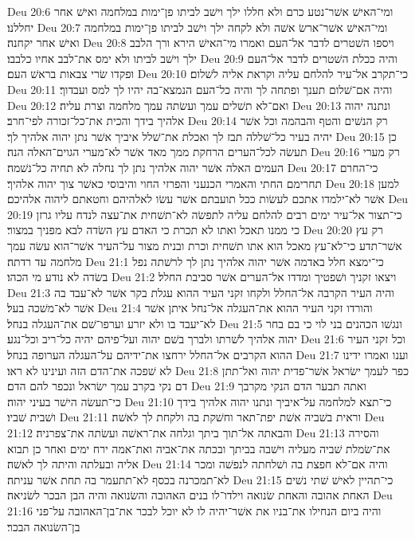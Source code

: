Deu 20:6  ומי־האישׁ אשׁר־נטע כרם ולא חללו ילך וישׁב לביתו פן־ימות במלחמה ואישׁ אחר יחללנו׃
Deu 20:7  ומי־האישׁ אשׁר־ארשׂ אשׁה ולא לקחה ילך וישׁב לביתו פן־ימות במלחמה ואישׁ אחר יקחנה׃
Deu 20:8  ויספו השׁטרים לדבר אל־העם ואמרו מי־האישׁ הירא ורך הלבב ילך וישׁב לביתו ולא ימס את־לבב אחיו כלבבו׃
Deu 20:9  והיה ככלת השׁטרים לדבר אל־העם ופקדו שׂרי צבאות בראשׁ העם׃
Deu 20:10  כי־תקרב אל־עיר להלחם עליה וקראת אליה לשׁלום׃
Deu 20:11  והיה אם־שׁלום תענך ופתחה לך והיה כל־העם הנמצא־בה יהיו לך למס ועבדוך׃
Deu 20:12  ואם־לא תשׁלים עמך ועשׂתה עמך מלחמה וצרת עליה׃
Deu 20:13  ונתנה יהוה אלהיך בידך והכית את־כל־זכורה לפי־חרב׃
Deu 20:14  רק הנשׁים והטף והבהמה וכל אשׁר יהיה בעיר כל־שׁללה תבז לך ואכלת את־שׁלל איביך אשׁר נתן יהוה אלהיך לך׃
Deu 20:15  כן תעשׂה לכל־הערים הרחקת ממך מאד אשׁר לא־מערי הגוים־האלה הנה׃
Deu 20:16  רק מערי העמים האלה אשׁר יהוה אלהיך נתן לך נחלה לא תחיה כל־נשׁמה׃
Deu 20:17  כי־החרם תחרימם החתי והאמרי הכנעני והפרזי החוי והיבוסי כאשׁר צוך יהוה אלהיך׃
Deu 20:18  למען אשׁר לא־ילמדו אתכם לעשׂות ככל תועבתם אשׁר עשׂו לאלהיהם וחטאתם ליהוה אלהיכם׃
Deu 20:19  כי־תצור אל־עיר ימים רבים להלחם עליה לתפשׂה לא־תשׁחית את־עצה לנדח עליו גרזן כי ממנו תאכל ואתו לא תכרת כי האדם עץ השׂדה לבא מפניך במצור׃
Deu 20:20  רק עץ אשׁר־תדע כי־לא־עץ מאכל הוא אתו תשׁחית וכרת ובנית מצור על־העיר אשׁר־הוא עשׂה עמך מלחמה עד רדתה׃
Deu 21:1  כי־ימצא חלל באדמה אשׁר יהוה אלהיך נתן לך לרשׁתה נפל בשׂדה לא נודע מי הכהו׃
Deu 21:2  ויצאו זקניך ושׁפטיך ומדדו אל־הערים אשׁר סביבת החלל׃
Deu 21:3  והיה העיר הקרבה אל־החלל ולקחו זקני העיר ההוא עגלת בקר אשׁר לא־עבד בה אשׁר לא־משׁכה בעל׃
Deu 21:4  והורדו זקני העיר ההוא את־העגלה אל־נחל איתן אשׁר לא־יעבד בו ולא יזרע וערפו־שׁם את־העגלה בנחל׃
Deu 21:5  ונגשׁו הכהנים בני לוי כי בם בחר יהוה אלהיך לשׁרתו ולברך בשׁם יהוה ועל־פיהם יהיה כל־ריב וכל־נגע׃
Deu 21:6  וכל זקני העיר ההוא הקרבים אל־החלל ירחצו את־ידיהם על־העגלה הערופה בנחל׃
Deu 21:7  וענו ואמרו ידינו לא שׁפכה את־הדם הזה ועינינו לא ראו׃
Deu 21:8  כפר לעמך ישׂראל אשׁר־פדית יהוה ואל־תתן דם נקי בקרב עמך ישׂראל ונכפר להם הדם׃
Deu 21:9  ואתה תבער הדם הנקי מקרבך כי־תעשׂה הישׁר בעיני יהוה׃
Deu 21:10  כי־תצא למלחמה על־איביך ונתנו יהוה אלהיך בידך ושׁבית שׁביו׃
Deu 21:11  וראית בשׁביה אשׁת יפת־תאר וחשׁקת בה ולקחת לך לאשׁה׃
Deu 21:12  והבאתה אל־תוך ביתך וגלחה את־ראשׁה ועשׂתה את־צפרניה׃
Deu 21:13  והסירה את־שׂמלת שׁביה מעליה וישׁבה בביתך ובכתה את־אביה ואת־אמה ירח ימים ואחר כן תבוא אליה ובעלתה והיתה לך לאשׁה׃
Deu 21:14  והיה אם־לא חפצת בה ושׁלחתה לנפשׁה ומכר לא־תמכרנה בכסף לא־תתעמר בה תחת אשׁר עניתה׃
Deu 21:15  כי־תהיין לאישׁ שׁתי נשׁים האחת אהובה והאחת שׂנואה וילדו־לו בנים האהובה והשׂנואה והיה הבן הבכר לשׂניאה׃
Deu 21:16  והיה ביום הנחילו את־בניו את אשׁר־יהיה לו לא יוכל לבכר את־בן־האהובה על־פני בן־השׂנואה הבכר׃
